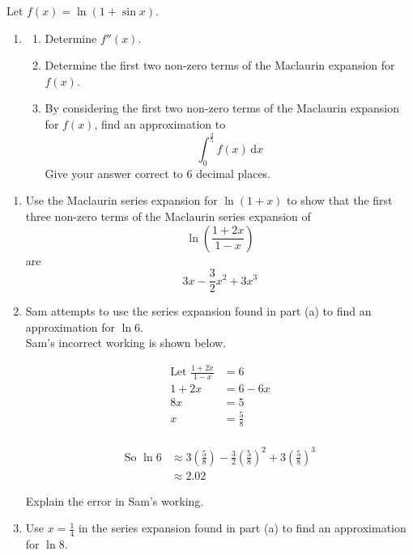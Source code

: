\documentclass[leqno]{article}
\begin{document}
\begin{enumerate}[
  label=\textbf{\arabic*.},
  leftmargin=*,
  topsep=0pt,
  partopsep=0pt,
  parsep=0pt
]
\newpage


\questionitem

Let $f(x)=\ln(1+\sin x)$. \\
\begin{enumerate}[label=\textbf{(\alph*)}]
  \item
  \begin{enumerate}[label=(\roman*)]
    \item Determine $f''(x)$. 
    \item Determine the first two non-zero terms of the Maclaurin expansion for $f(x)$. 
    \item By considering the first two non-zero terms of the Maclaurin expansion for $f(x)$, find an approximation to
    \[
    \int_0^{\frac{2}{5}} f(x)\,\mathrm{d}x
    \]
    Give your answer correct to $6$ decimal places.  \\
  \end{enumerate}
\end{enumerate}

\newpage

\questionitem

\begin{enumerate}[label=\textbf{(\alph*)}]
  \item Use the Maclaurin series expansion for $\ln(1+x)$ to show that the first three non-zero terms of the Maclaurin series expansion of
  \[
  \ln\left(\frac{1+2x}{1-x}\right)
  \]
  are
  \[
  3x-\frac{3}{2}x^2+3x^3
  \]
  \item Sam attempts to use the series expansion found in part (a) to find an approximation for $\ln 6$. \\

  Sam's incorrect working is shown below.
\begin{tcolorbox}[enhanced,boxrule=0.4pt,colback=white,arc=0mm,outer arc=0mm]
  \[
  \begin{aligned}
  \text{Let } \frac{1+2x}{1-x} &= 6\\
  1+2x &= 6-6x\\
  8x &= 5\\
  x &= \frac{5}{8} 
  \end{aligned}
  \] \\
  \[
  \begin{aligned}
  \text{So } \ln 6 &\approx 3\left(\frac{5}{8}\right)-\frac{3}{2}\left(\frac{5}{8}\right)^2+3\left(\frac{5}{8}\right)^3\\
  &\approx 2.02
  \end{aligned}
  \]
\end{tcolorbox}
  Explain the error in Sam's working.  \\
  \item Use $x=\frac{1}{4}$ in the series expansion found in part (a) to find an approximation for $\ln 8$. \\


\end{enumerate}
\end{enumerate}
\end{document}
